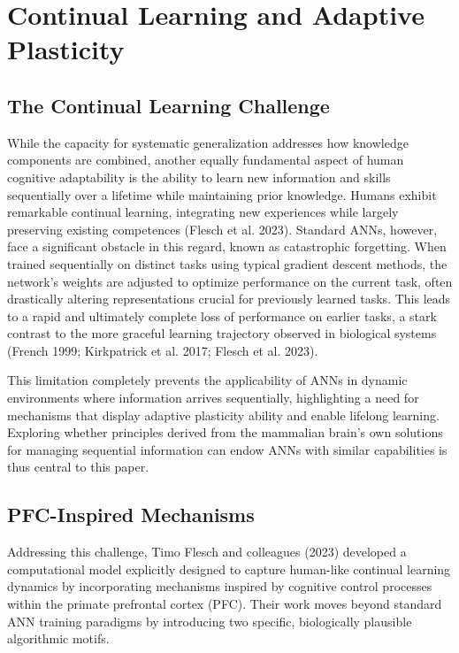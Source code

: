 \documentclass[
10pt, %
a4paper, %
oneside, %
headinclude,footinclude, %
BCOR5mm, %
]{scrartcl}
\begin{document}

\section{Continual Learning and Adaptive Plasticity}

\subsection{The Continual Learning Challenge}

While the capacity for systematic generalization addresses how knowledge components are combined, another equally fundamental aspect of human cognitive adaptability is the ability to learn new information and skills sequentially over a lifetime while maintaining prior knowledge. Humans exhibit remarkable continual learning, integrating new experiences while largely preserving existing competences (Flesch et al. 2023). Standard ANNs, however, face a significant obstacle in this regard, known as catastrophic forgetting. When trained sequentially on distinct tasks using typical gradient descent methods, the network's weights are adjusted to optimize performance on the current task, often drastically altering representations crucial for previously learned tasks. This leads to a rapid and ultimately complete loss of performance on earlier tasks, a stark contrast to the more graceful learning trajectory observed in biological systems (French 1999; Kirkpatrick et al. 2017; Flesch et al. 2023). 

This limitation completely prevents the applicability of ANNs in dynamic environments where information arrives sequentially, highlighting a need for mechanisms that display adaptive plasticity ability and enable lifelong learning. Exploring whether principles derived from the mammalian brain's own solutions for managing sequential information can endow ANNs with similar capabilities is thus central to this paper.

\subsection{PFC-Inspired Mechanisms}

Addressing this challenge, Timo Flesch and colleagues (2023) developed a computational model explicitly designed to capture human-like continual learning dynamics by incorporating mechanisms inspired by cognitive control processes within the primate prefrontal cortex (PFC). Their work moves beyond standard ANN training paradigms by introducing two specific, biologically plausible algorithmic motifs.
\end{document}
